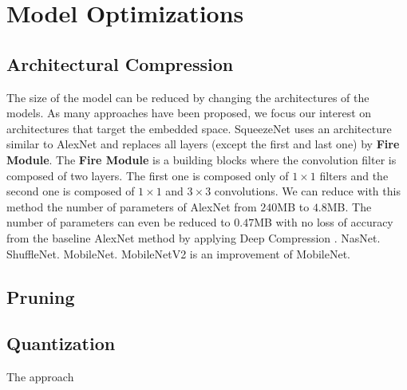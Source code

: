 \section{Model Optimizations} \label{sec:mdopti}
\subsection{Architectural Compression}
The size of the model can be reduced by changing the architectures of the models. As many approaches have been proposed, we focus our interest on architectures that target the embedded space.
SqueezeNet \cite{} uses an architecture similar to AlexNet and replaces all layers (except the first and last one) by \textbf{Fire Module}. The \textbf{Fire Module} is a building blocks where the convolution filter is composed of two layers. The first one is composed only of $1 \times 1$ filters and the second one is composed of $1 \times 1$ and $3 \times 3$ convolutions. We can reduce with this method the number of parameters of AlexNet from $240$MB to $4.8$MB. The number of parameters can even be reduced to $0.47$MB with no loss of accuracy from the baseline AlexNet method by applying Deep Compression \cite{}. \newline \newline
NasNet.\newline \newline
ShuffleNet.\newline \newline
MobileNet.\newline \newline
MobileNetV2 \cite{} is an improvement of MobileNet.\newline \newline
\subsection{Pruning}
\subsection{Quantization}
The approach 